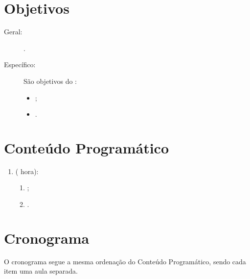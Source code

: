 \documentclass{article}
\begin{document}
\section{Objetivos}

\begin{description}
    \item[Geral:] .
    \item[Específico:] São objetivos do :
        \begin{itemize}[label={-}]
                \item {};
                \item {}.
        \end{itemize}
\end{description}

\section{Conteúdo Programático}

\begin{enumerate}
    \item {} ( hora):
        \begin{samepage}
        \begin{enumerate}
                \item {};
                \item {}.
        \end{enumerate}
        \end{samepage}
\end{enumerate}

\section{Cronograma}

O cronograma segue a mesma ordenação do Conteúdo Programático, sendo cada item
uma aula separada.

\nocite{*}


\end{document}
